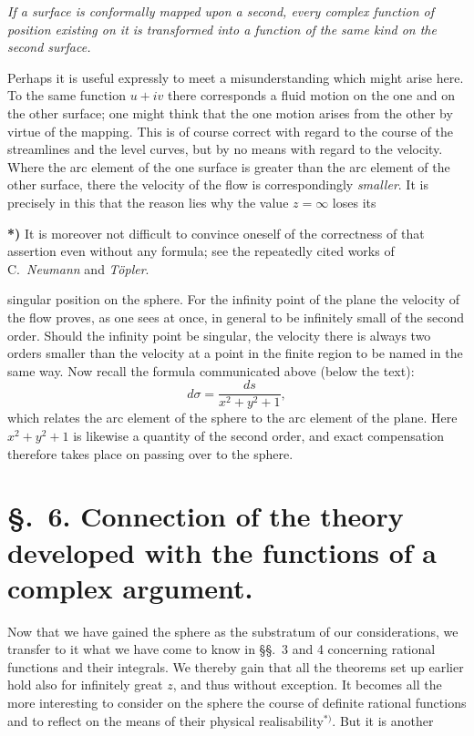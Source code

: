 \documentclass{article}
\begin{document}
\emph{If a surface is conformally mapped upon a second, every complex function of position existing on it is transformed into a function of the same kind on the second surface.}

Perhaps it is useful expressly to meet a misunderstanding which might arise here. To the same function $u + iv$ there corresponds a fluid motion on the one and on the other surface; one might think that the one motion arises from the other by virtue of the mapping. This is of course correct with regard to the course of the streamlines and the level curves, but by no means with regard to the velocity. Where the arc element of the one surface is greater than the arc element of the other surface, there the velocity of the flow is correspondingly \emph{smaller}. It is precisely in this that the reason lies why the value $z = \infty$ loses its

\textbf{*)} It is moreover not difficult to convince oneself of the correctness of that assertion even without any formula; see the repeatedly cited works of C.\ \emph{Neumann} and \emph{Töpler}.

singular position on the sphere. For the infinity point of the plane the velocity of the flow proves, as one sees at once, in general to be infinitely small of the second order. Should the infinity point be singular, the velocity there is always two orders smaller than the velocity at a point in the finite region to be named in the same way. Now recall the formula communicated above (below the text):
\[ d\sigma = \frac{ds}{x^{2} + y^{2} + 1}, \]
which relates the arc element of the sphere to the arc element of the plane. Here $x^{2} + y^{2} + 1$ is likewise a quantity of the second order, and exact compensation therefore takes place on passing over to the sphere.

\section*{§.~6. Connection of the theory developed with the functions of a complex argument.}

Now that we have gained the sphere as the substratum of our considerations, we transfer to it what we have come to know in §§.~3 and 4 concerning rational functions and their integrals. We thereby gain that all the theorems set up earlier hold also for infinitely great $z$, and thus without exception. It becomes all the more interesting to consider on the sphere the course of definite rational functions and to reflect on the means of their physical realisability${}^{*)}$. But it is another
\end{document}
